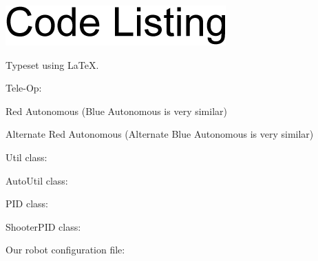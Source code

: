 \documentclass[letterpaper,10pt]{article}
\newcommand{\latex}{\LaTeX}
\begin{document}
\begin{flushleft}

\includegraphics{./CodeListingArial14.png}

\medskip

Typeset using \latex.

\medskip

Tele-Op:



\pagebreak

Red Autonomous (Blue Autonomous is very similar)



\pagebreak

Alternate Red Autonomous (Alternate Blue Autonomous is very similar)



\pagebreak

Util class:



\pagebreak

AutoUtil class:





%

\pagebreak

PID class:



\pagebreak

ShooterPID class:



\pagebreak

Our robot configuration file:



\end{flushleft}
\end{document}
